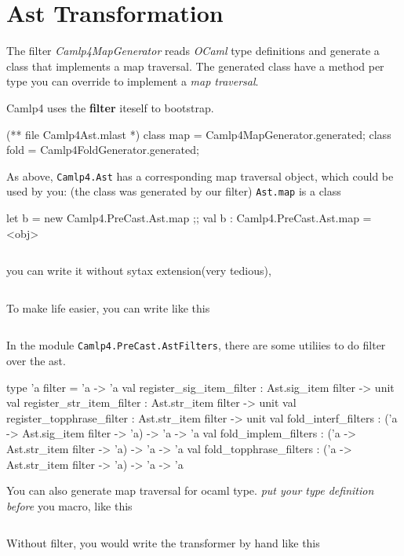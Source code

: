 \section{Ast Transformation}
\label{transform}

The filter \emph{Camlp4MapGenerator} reads \emph{OCaml} type
definitions and generate a class that implements a map traversal.  The
generated class have a method per type you can override to implement a
\emph{map traversal}.

Camlp4 uses the \textbf{ filter} iteself to bootstrap.


\begin{ocamlcode}
(** file Camlp4Ast.mlast *)
class map = Camlp4MapGenerator.generated;
class fold = Camlp4FoldGenerator.generated;
\end{ocamlcode}

As above, \verb|Camlp4.Ast| has a corresponding map traversal object,
which could be used by you: (the class was generated by our filter)
\verb|Ast.map| is a class
\begin{ocamlcode}
let b = new Camlp4.PreCast.Ast.map ;;
val b : Camlp4.PreCast.Ast.map = <obj>
\end{ocamlcode}

\inputminted[fontsize=\scriptsize, firstline=1,lastline=9]{ocaml}{camlp4/code/ast_add_zero.ml}
you can write it without sytax extension(very tedious),
\inputminted[fontsize=\scriptsize, firstline=11,lastline=31]{ocaml}{camlp4/code/ast_add_zero.ml}
To make life easier, you can write like this 
\inputminted[fontsize=\scriptsize, firstline=32,lastline=38]{ocaml}{camlp4/code/ast_add_zero.ml}

In the module \verb|Camlp4.PreCast.AstFilters|, there are some
utiliies to do filter over the ast.
\begin{ocamlcode}
    type 'a filter = 'a -> 'a
    val register_sig_item_filter : Ast.sig_item filter -> unit
    val register_str_item_filter : Ast.str_item filter -> unit
    val register_topphrase_filter : Ast.str_item filter -> unit
    val fold_interf_filters : ('a -> Ast.sig_item filter -> 'a) -> 'a -> 'a
    val fold_implem_filters : ('a -> Ast.str_item filter -> 'a) -> 'a -> 'a
    val fold_topphrase_filters :
      ('a -> Ast.str_item filter -> 'a) -> 'a -> 'a
\end{ocamlcode}


You can also generate map traversal for ocaml type. \emph{put your
  type definition before} you macro, like this
\inputminted[fontsize=\scriptsize, ]{ocaml}{camlp4/code/ast_map.ml}
Without filter, you would write the transformer by hand like this 
\inputminted[fontsize=\scriptsize, ]{ocaml}{camlp4/code/ast_map_o.ml}


